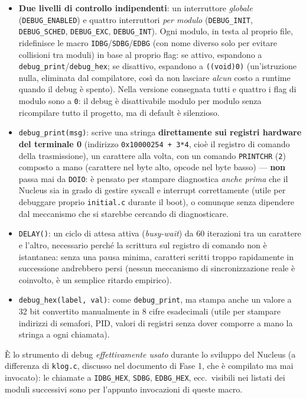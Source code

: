 \documentclass[11pt,a4paper]{article}
\newcommand{\code}[1]{\texttt{#1}}
\begin{document}
\begin{itemize}
\item \textbf{Due livelli di controllo indipendenti}: un interruttore
  \emph{globale} (\code{DEBUG\_ENABLED}) e quattro interruttori
  \emph{per modulo} (\code{DEBUG\_INIT}, \code{DEBUG\_SCHED},
  \code{DEBUG\_EXC}, \code{DEBUG\_INT}). Ogni modulo, in testa al proprio
  file, ridefinisce le macro \code{IDBG}/\code{SDBG}/\code{EDBG} (con nome
  diverso solo per evitare collisioni tra moduli) in base al proprio flag:
  se attivo, espandono a \code{debug\_print}/\code{debug\_hex}; se
  disattivo, espandono a \code{((void)0)} (un'istruzione nulla, eliminata
  dal compilatore, così da non lasciare \emph{alcun} costo a runtime quando
  il debug è spento). Nella versione consegnata tutti e quattro i flag di
  modulo sono a \code{0}: il debug è disattivabile modulo per modulo senza
  ricompilare tutto il progetto, ma di default è silenzioso.
\item \code{debug\_print(msg)}: scrive una stringa \textbf{direttamente sui
  registri hardware del terminale 0} (indirizzo \code{0x10000254 + 3*4},
  cioè il registro di comando della trasmissione), un carattere alla
  volta, con un comando \code{PRINTCHR} (\code{2}) composto a mano
  (carattere nel byte alto, opcode nel byte basso) --- \textbf{non} passa
  mai da \code{DOIO}: è pensato per stampare diagnostica \emph{anche prima}
  che il Nucleus sia in grado di gestire syscall e interrupt correttamente
  (utile per debuggare proprio \code{initial.c} durante il boot), o
  comunque senza dipendere dal meccanismo che si starebbe cercando di
  diagnosticare.
\item \code{DELAY()}: un ciclo di attesa attiva (\emph{busy-wait}) da 60
  iterazioni tra un carattere e l'altro, necessario perché la scrittura sul
  registro di comando non è istantanea: senza una pausa minima, caratteri
  scritti troppo rapidamente in successione andrebbero persi (nessun
  meccanismo di sincronizzazione reale è coinvolto, è un semplice ritardo
  empirico).
\item \code{debug\_hex(label, val)}: come \code{debug\_print}, ma stampa
  anche un valore a 32 bit convertito manualmente in 8 cifre esadecimali
  (utile per stampare indirizzi di semafori, PID, valori di registri senza
  dover comporre a mano la stringa a ogni chiamata).
\end{itemize}
\`E lo strumento di debug \emph{effettivamente usato} durante lo sviluppo
del Nucleus (a differenza di \code{klog.c}, discusso nel documento di Fase
1, che è compilato ma mai invocato): le chiamate a \code{IDBG\_HEX},
\code{SDBG}, \code{EDBG\_HEX}, ecc.\ visibili nei listati dei moduli
successivi sono per l'appunto invocazioni di queste macro.
\end{document}
